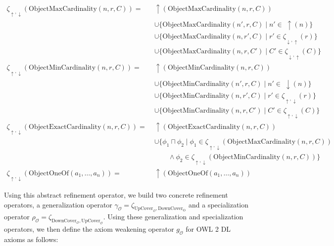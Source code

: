 \begin{align*}
    \zeta_{\uparrow, \downarrow}(\mathrm{ObjectMaxCardinality}(n, r, C)) = \;& \uparrow (\mathrm{ObjectMaxCardinality}(n, r, C)) \\&  \cup \{\mathrm{ObjectMaxCardinality}(n', r, C) \mid n' \in \; \uparrow (n)\} \\&   \cup \{\mathrm{ObjectMaxCardinality}(n, r', C) \mid r' \in \zeta_{\downarrow, \uparrow}(r)\} \\&  \cup \{\mathrm{ObjectMaxCardinality}(n, r, C') \mid C' \in \zeta_{\downarrow, \uparrow} (C)\} \\
    \zeta_{\uparrow, \downarrow}(\mathrm{ObjectMinCardinality}(n, r, C)) = \;& \uparrow (\mathrm{ObjectMinCardinality}(n, r, C)) \\& \cup \{\mathrm{ObjectMinCardinality}(n', r, C) \mid n' \in \; \downarrow (n)\} \\& \cup \{\mathrm{ObjectMinCardinality}(n, r', C) \mid r' \in \zeta_{\uparrow, \downarrow}(r)\} \\& \cup \{\mathrm{ObjectMinCardinality}(n, r, C') \mid C' \in \zeta_{\uparrow, \downarrow} (C)\} \\
    \zeta_{\uparrow, \downarrow}(\mathrm{ObjectExactCardinality}(n, r, C)) = \;& \uparrow (\mathrm{ObjectExactCardinality}(n, r, C)) \\& \cup \{ \phi_1 \sqcap \phi_2   \mid \phi_1 \in \zeta_{\uparrow, \downarrow} (\mathrm{ObjectMaxCardinality}(n, r, C)) \\ \;& \qquad \land \phi_2 \in \zeta_{\uparrow, \downarrow} (\mathrm{ObjectMinCardinality}(n, r, C)) \} \\
    \zeta_{\uparrow, \downarrow}(\mathrm{ObjectOneOf}(a_1, \dots, a_n)) = \;& \uparrow (\mathrm{ObjectOneOf}(a_1, \dots, a_n))
\end{align*}
\endgroup

Using this abstract refinement operator, we build two concrete refinement operators, a generalization operator $\gamma_\mathcal{O} = \zeta_{\mathrm{UpCover}_\mathcal{O}, \mathrm{DownCover}_\mathrm{O}}$ and a specialization operator $\rho_\mathcal{O} = \zeta_{\mathrm{DownCover}_\mathcal{O}, \mathrm{UpCover}_\mathcal{O}}$. Using these generalization and specialization operators, we then define the axiom weakening operator $g_\mathcal{O}$ for OWL 2 DL axioms as follows:

